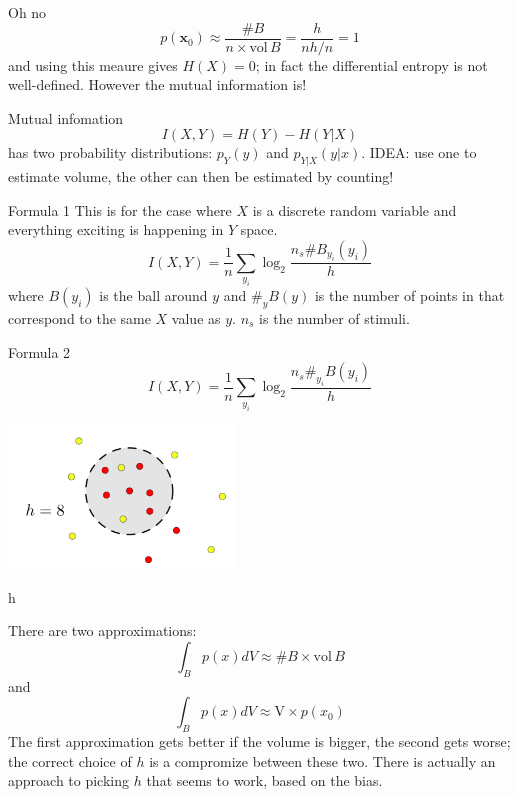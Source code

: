 \documentclass{beamer}
\begin{document}
\begin{frame}{Oh no}
\color{dark}
$$p(\mathbf{x}_0)\approx\frac{\#B}{n\times \mbox{vol}\,B}=\frac{h}{nh/n}=1$$
\color{black}
and using this meaure gives $H(X)=0$; in fact the
  differential entropy is not well-defined. However the
  mutual information is!
\end{frame}


\begin{frame}{Mutual infomation}
\color{dark}
$$I(X,Y)=H(Y)-H(Y|X)$$ 
\color{black}
has two probability distributions: $p_Y(y)$ and
  $p_{Y|X}(y|x)$.
\vskip 1cm
IDEA: use one to estimate volume, the other can then
  be estimated by counting!
\end{frame}

\begin{frame}{Formula 1}
This is for the case where $X$ is a discrete random variable and
everything exciting is happening in $Y$ space.
\color{dark}
$$I(X,Y)=\frac{1}{n}\sum_{y_i}\log_2{\frac{n_s\#B_{y_i}(y_i)}{h}}$$
\color{black} where $B(y_i)$ is the ball around $y$ and $\#_y{B(y)}$
  is the number of points in that correspond to the same $X$ value as
  $y$. $n_s$ is the number of stimuli.
\end{frame}


\begin{frame}{Formula 2}
\color{dark}
$$I(X,Y)=\frac{1}{n}\sum_{y_i}\log_2{\frac{n_s \#_{y_i}B(y_i)}{h}}$$
\color{black}
\begin{center}
\includegraphics[width=6cm]{dots.png}
\end{center}
\end{frame}


\begin{frame}{h}

  There are two approximations:
  \color{dark}
$$\int_B p(x)dV \approx \# B\times \mbox{vol}\,B$$
\color{black}
  and
\color{dark}
  $$\int_B p(x)dV \approx \mbox{V}\times p(x_0)$$ 
\color{black}
The first approximation gets better if the volume is bigger, the
second gets worse; the correct choice of $h$ is a compromize between
these two. There is actually an approach to picking $h$ that
seems to work, based on the bias.
\end{frame}
\end{document}
